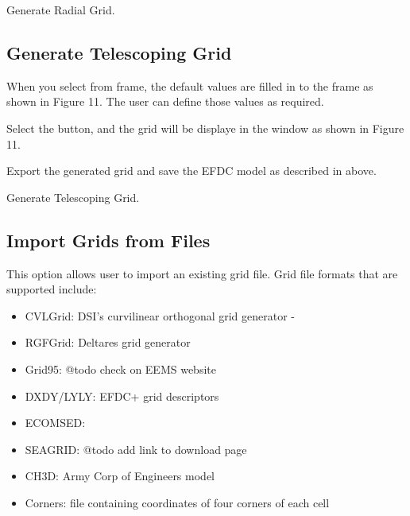 \documentclass[letterpaper,10pt,english]{sphinxmanual}
\begin{document}
 Generate Radial Grid.


\subsection{Generate Telescoping Grid}
\label{\detokenize{gridgen/telescopegrid:generate-telescoping-grid}}\label{\detokenize{gridgen/telescopegrid:telescopegrid}}\label{\detokenize{gridgen/telescopegrid::doc}}
When you select  from  frame,
the default values are filled in to the  frame as
shown in Figure 11. The user can define those values as required.

Select the  button, and the grid will be displaye in the
window as shown in Figure 11.

Export the generated grid and save the EFDC model as described in
{\hyperref[\detokenize{gridgen/uniformgrid:uniformgrid}]{}} above.


 Generate Telescoping Grid.


\subsection{Import Grids from Files}
\label{\detokenize{gridgen/importgrid:import-grids-from-files}}\label{\detokenize{gridgen/importgrid:importgrid}}\label{\detokenize{gridgen/importgrid::doc}}
This option allows user to import an existing grid file. Grid file
formats that are supported include:
\begin{itemize}
\item {} 
CVLGrid: DSI’s curvilinear orthogonal grid generator - 

\item {} 
RGFGrid: Deltares grid generator

\item {} 
Grid95: @todo check on EEMS website

\item {} 
DXDY/LYLY: EFDC+ grid descriptors

\item {} 
ECOMSED:

\item {} 
SEAGRID: @todo add link to download page

\item {} 
CH3D: Army Corp of Engineers model

\item {} 
Corners: file containing coordinates of four corners of each cell

\end{itemize}
\end{document}
